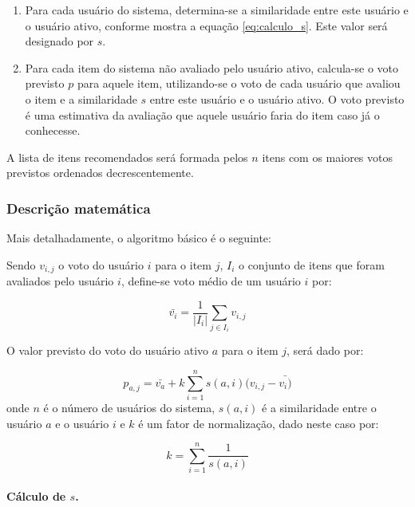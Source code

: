 \begin{enumerate}
\item 
Para cada usuário do sistema, determina-se a similaridade entre este usuário e o usuário ativo, conforme mostra a equação \ref{eq:calculo_s}. Este valor será designado por $s$.

\item Para cada item do sistema não avaliado pelo usuário ativo, calcula-se o voto previsto $p$ para aquele item, utilizando-se o voto de cada usuário que avaliou o item e a similaridade $s$ entre este usuário e o usuário ativo. O voto previsto é uma estimativa da avaliação que aquele usuário faria do item caso já o conhecesse.
\end{enumerate}

A lista de itens recomendados será formada pelos $n$ itens com os maiores votos previstos ordenados decrescentemente.

\subsubsection{Descrição matemática}
Mais detalhadamente, o algoritmo básico é o seguinte:

Sendo $v_{i,j}$ o voto do usuário $i$ para o item $j$, $I_{i}$ o conjunto de itens que foram avaliados pelo usuário $i$, define-se voto médio de um usuário $i$ por:

\begin{equation}
 \bar{v_{i}} = \frac{1}{|I_{i}|} \sum_{j \in I_{i}} v_{i,j}
\end{equation}

O valor previsto do voto do usuário ativo $a$ para o item $j$, será dado por:

\begin{equation}
 p_{a,j} = \bar{v_{a}} + k\sum_{i=1}^n{s(a,i) (v_{i,j} - \bar{v_{i})}}
 \label{eq:filtragem_colaborativa_similaridade} 
\end{equation}
onde $n$ é o número de usuários do sistema, $s(a,i)$ é a similaridade entre o usuário $a$ e o usuário $i$ e $k$ é um fator de normalização, dado neste caso por:

\begin{equation}
 k = \sum_{i=1}^n{\frac{1}{s(a,i)}}
\end{equation}


\paragraph{Cálculo de $s$.}

